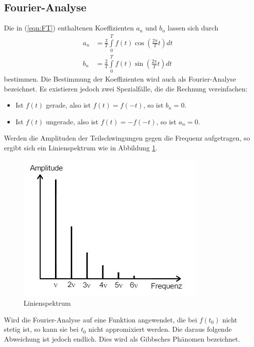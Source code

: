\subsection{Fourier-Analyse}
Die in (\ref{eqn:FT}) enthaltenen Koeffizienten $a_n$ und $b_n$ lassen sich durch
\begin{align}
  a_n &= \frac{2}{T}\int\limits_{0}^T f(t)\cos{(\frac{2\pi}{T}t)}dt  \label{eqn:an} \\
  b_n &= \frac{2}{T}\int\limits_{0}^T f(t)\sin{(\frac{2\pi}{T}t)}dt  \label{eqn:bn}
\end{align}
bestimmen.
Die Bestimmung der Koeffizienten wird auch als Fourier-Analyse bezeichnet.
Es existieren jedoch zwei Spezialfälle, die die Rechnung vereinfachen:
\begin{itemize}
  \item Ist $f(t)$ gerade, also ist $f(t)=f(-t)$, so ist $b_n=0$.
    \item Ist $f(t)$ ungerade, also ist $f(t)=-f(-t)$, so ist $a_n=0$.
\end{itemize}
Werden die Amplituden der Teilschwingungen gegen die Frequenz aufgetragen,
so ergibt sich ein Linienspektrum wie in Abbildung \ref{fig:linie}.
\begin{figure}[H]
  \centering
  \includegraphics{Text/Bilder/linie.jpg}
  \caption{Linienspektrum \cite[271]{sample}}
  \label{fig:linie}
\end{figure}
Wird die Fourier-Analyse auf eine Funktion angewendet, die bei $f(t_\text{0})$ nicht stetig ist, so kann sie bei $t_\text{0}$
nicht appromixiert werden. Die daraus folgende Abweichung ist jedoch endlich.
Dies wird als Gibbsches Phänomen bezeichnet.

